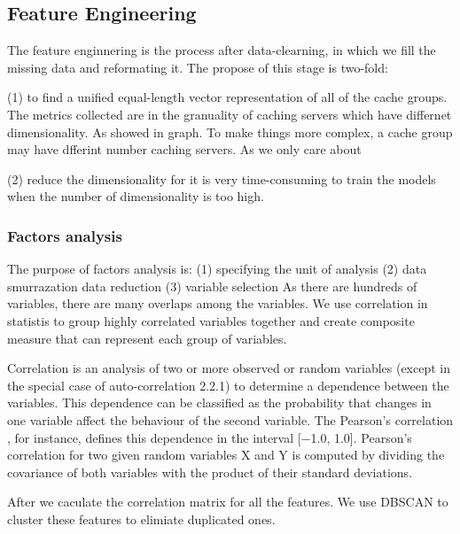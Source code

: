 \documentclass[5p]{elsarticle}
\begin{document}
\subsection{Feature Engineering}
The feature enginnering is the process after data-clearning, in which we fill the missing data and reformating it. The propose of this stage is two-fold:

(1) to find a unified equal-length vector representation of all of the cache groups. 
The metrics collected are in the granuality of caching servers which have differnet dimensionality. As showed in graph. To make things more complex, a cache group may have dfferint number caching servers. As we only care about

(2) reduce the dimensionality for it is very time-consuming to train the models when the number of dimensionality is too high.

\subsubsection{Factors analysis}
The purpose of factors analysis is: (1) specifying the unit of analysis (2) data smurrazation data reduction (3) variable selection
As there are hundreds of variables, there are many overlaps among the variables. We use correlation in statistis to group highly correlated variables together and create composite measure that can represent each group of variables.

Correlation is an analysis of two or more observed or random variables (except in the special case of auto-correlation 2.2.1) to determine a dependence between the variables. This dependence can be classified as the probability that changes in one variable affect the behaviour of the second variable. The Pearson’s correlation , for instance, defines this dependence in the interval [−1.0, 1.0]. Pearson’s correlation for two given random variables X and Y is computed by dividing the covariance of both variables with the product of their standard deviations.

After we caculate the correlation matrix for all the features. We use DBSCAN to cluster these features to elimiate duplicated ones.
\end{document}
